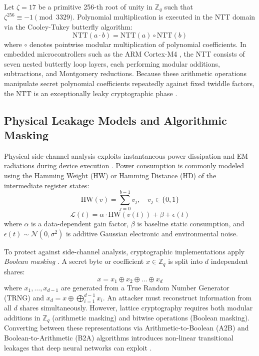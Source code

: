 \documentclass[letterpaper]{article}
\begin{document}
Let $\zeta = 17$ be a primitive 256-th root of unity in $\mathbb{Z}_q$ such that $\zeta^{256} \equiv -1 \pmod{3329}$. Polynomial multiplication is executed in the NTT domain via the Cooley-Tukey butterfly algorithm:
\begin{equation}
\text{NTT}(a \cdot b) = \text{NTT}(a) \circ \text{NTT}(b)
\label{eq:ntt_multiplication}
\end{equation}
where $\circ$ denotes pointwise modular multiplication of polynomial coefficients. In embedded microcontrollers such as the ARM Cortex-M4 \cite{kannwischer2019pqm4}, the NTT consists of seven nested butterfly loop layers, each performing modular additions, subtractions, and Montgomery reductions. Because these arithmetic operations manipulate secret polynomial coefficients repeatedly against fixed twiddle factors, the NTT is an exceptionally leaky cryptographic phase \cite{roychoudhury2019accelerating,amiet2020leakage,danvers2022side}.

\subsection{Physical Leakage Models and Algorithmic Masking}
Physical side-channel analysis exploits instantaneous power dissipation and EM radiations during device execution \cite{kocher1999differential,mangard2007power}. Power consumption is commonly modeled using the Hamming Weight ($\text{HW}$) or Hamming Distance ($\text{HD}$) of the intermediate register states:
\begin{equation}
\text{HW}(v) = \sum_{j=0}^{b-1} v_j, \quad v_j \in \{0, 1\}
\label{eq:hw_def}
\end{equation}
\begin{equation}
\mathcal{L}(t) = \alpha \cdot \text{HW}(v(t)) + \beta + \epsilon(t)
\label{eq:leakage_model}
\end{equation}
where $\alpha$ is a data-dependent gain factor, $\beta$ is baseline static consumption, and $\epsilon(t) \sim \mathcal{N}(0, \sigma^2)$ is additive Gaussian electronic and environmental noise.

To protect against side-channel analysis, cryptographic implementations apply \textit{Boolean masking} \cite{chari1999towards,reparaz2015masked,barthe2015formal}. A secret byte or coefficient $x \in \mathbb{Z}_q$ is split into $d$ independent shares:
\begin{equation}
x = x_1 \oplus x_2 \oplus \dots \oplus x_d
\label{eq:boolean_masking}
\end{equation}
where $x_1, \dots, x_{d-1}$ are generated from a True Random Number Generator (TRNG) and $x_d = x \oplus \bigoplus_{i=1}^{d-1} x_i$. An attacker must reconstruct information from all $d$ shares simultaneously. However, lattice cryptography requires both modular additions in $\mathbb{Z}_q$ (arithmetic masking) and bitwise operations (Boolean masking). Converting between these representations via Arithmetic-to-Boolean (A2B) and Boolean-to-Arithmetic (B2A) algorithms introduces non-linear transitional leakages that deep neural networks can exploit \cite{goubin2001des,coron2014conversion,schneider2015arithmetic,danvers2022side}.
\end{document}
